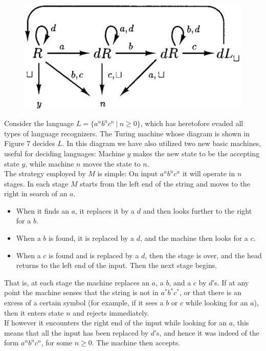 \begin{figure}[H]
  \centering
  \includegraphics[width=\linewidth]{img/fig-4.11.png}
  \caption{}
  \label{fig:4.7}
\end{figure}

\begin{example}{}
\quad Consider the language $L = \{ a^nb^nc^n\ |\ n \geq 0 \}$, which has heretofore evaded all types of language recognizers. The Turing machine whose diagram is shown in Figure 7 decides $L$. In this diagram we have also utilized two new basic machines, useful for deciding languages: Machine $y$ makes the new state to be the accepting state $y$, while machine $n$ moves the state to $n$. \\

\quad The strategy employed by $M$ is simple: On input $a^nb^nc^n$ it will operate in $n$ stages. In each stage $M$ starts from the left end of the string and moves to the right in search of an $a$. 
\begin{itemize}
  \item When it finds an $a$, it replaces it by a $d$ and then looks further to the right for a $b$.
  \item When a $b$ is found, it is replaced by a $d$, and the machine then looks for a $c$.
  \item When a $c$ is found and is replaced by a $d$, then the stage is over, and the head returns to the left end of the input. Then the next stage begins. \newline
\end{itemize}

\quad That is, at each stage the machine replaces an $a$, a $b$, and a 
$c$ by $d$'s. If at any point the machine senses that the string is not in $a^*b^*c^*$, or that there is an excess of a certain symbol (for example, if it sees a $b$ or $c$ while looking for an $a$), then it enters state $n$ and rejects immediately. \\

\quad If however it encounters the right end of the input while looking for an $a$, this means that all the input has been replaced by $d$'s, and hence it was indeed of the form $a^nb^nc^n$, for some $n \geq 0$. The machine then accepts.
\end{example}


